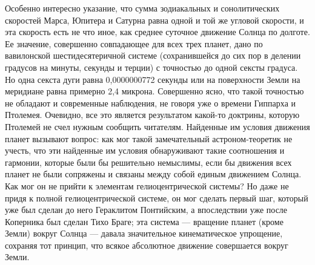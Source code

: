 Особенно интересно указание, что сумма зодиакальных и сонолитических
скоростей Марса, Юпитера и Сатурна равна одной и той же угловой
скорости, и эта скорость есть не что иное, как среднее суточное
движение Солнца по долготе. Ее значение, совершенно совпадающее для
всех трех планет, дано по вавилонской шестидесятеричной системе
(сохранившейся до сих пор в делении градусов на минуты, секунды и
терции) с точностью до одной сексты градуса. Но одна секста дуги равна
0,0000000772 секунды или на поверхности Земли на меридиане равна
примерно 2,4 микрона. Совершенно ясно, что такой точностью не обладают
и современные наблюдения, не говоря уже о времени Гиппарха и Птолемея.
Очевидно, все это является результатом какой-то доктрины, которую
Птолемей не счел нужным сообщить читателям. Найденные им условия
движения планет вызывают вопрос: как мог такой замечательный
астроном-теоретик не учесть, что эти найденные им условия обнаруживают
такие соотношения и гармонии, которые были бы решительно немыслимы,
если бы движения всех планет не были сопряжены и связаны между собой
единым движением Солнца. Как мог он не прийти к элементам
гелиоцентрической системы? Но даже не придя к полной гелиоцентрической
системе, он мог сделать первый шаг, который уже был сделан до него
Гераклитом Понтийским, а впоследствии уже после Коперника был сделан
Тихо Браге; эта система --- вращение планет (кроме Земли) вокруг
Солнца --- давала значительное кинематическое упрощение, сохраняя тот
принцип, что всякое абсолютное движение совершается вокруг Земли.

